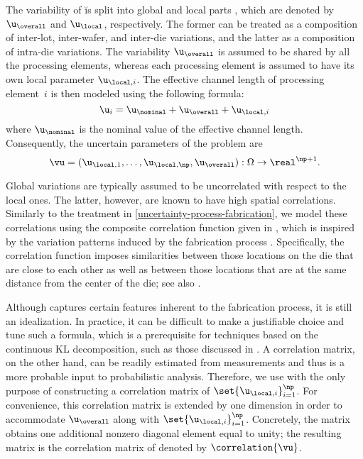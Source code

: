 The variability of \u is split into global and local parts \cite{shen2009,
chandra2010, juan2012}, which are denoted by $\u_\overall$ and $\u_\local$,
respectively. The former can be treated as a composition of inter-lot,
inter-wafer, and inter-die variations, and the latter as a composition of
intra-die variations. The variability $\u_\overall$ is assumed to be shared by
all the \np processing elements, whereas each processing element is assumed to
have its own local parameter $\u_{\local, i}$. The effective channel length of
processing element~$i$ is then modeled using the following formula:
\[
  \u_i = \u_\nominal + \u_\overall + \u_{\local, i}
\]
where $\u_\nominal$ is the nominal value of the effective channel length.
Consequently, the uncertain parameters of the problem are
\[
  \vu = (\u_{\local, 1}, \dotsc, \u_{\local, \np}, \u_\overall): \Omega \to \real^{\np + 1}.
\]

Global variations are typically assumed to be uncorrelated with respect to the
local ones. The latter, however, are known to have high spatial correlations.
Similarly to the treatment in \cref{uncertainty-process-fabrication}, we model
these correlations using the composite correlation function given in
, which is inspired by the variation patterns induced by
the fabrication process \cite{friedberg2005, chandrakasan2000, cheng2011}.
Specifically, the correlation function imposes similarities between those
locations on the die that are close to each other as well as between those
locations that are at the same distance from the center of the die; see also
\cite{ghanem1991, ghanta2006, bhardwaj2008, huang2009a, lee2013}.

Although  captures certain features inherent to the
fabrication process, it is still an idealization. In practice, it can be
difficult to make a justifiable choice and tune such a formula, which is a
prerequisite for techniques based on the continuous \ac{KL} decomposition, such
as those discussed in . A correlation matrix, on the other
hand, can be readily estimated from measurements and thus is a more probable
input to probabilistic analysis. Therefore, we use  with
the only purpose of constructing a correlation matrix of $\set{\u_{\local,
i}}_{i = 1}^\np$. For convenience, this correlation matrix is extended by one
dimension in order to accommodate $\u_\overall$ along with $\set{\u_{\local,
i}}_{i = 1}^\np$. Concretely, the matrix obtains one additional nonzero diagonal
element equal to unity; the resulting matrix is the correlation matrix of \vu
denoted by $\correlation{\vu}$.

